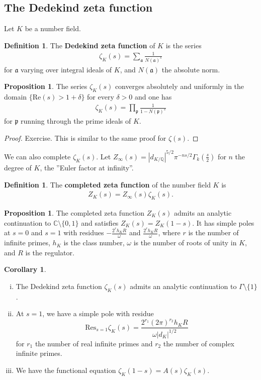 \documentclass{article}
\theoremstyle{definition}
\newtheorem{cor}[theorem]{Corollary}
\newtheorem{prop}[theorem]{Proposition}
\newtheorem{defn}[theorem]{Definition}
\begin{document}
\subsection{The Dedekind zeta function}


Let $K$ be a number field.
\begin{defn}\label{defn2.21}
    The \textbf{Dedekind zeta function} of $K$ is the series 
    \begin{align*}
        \zeta_K(s) = \sum_{\mathfrak{a}}^{} \frac{1}{N(\mathfrak{a})^s} 
    \end{align*}
    for $\mathfrak{a}$ varying over integral ideals of $K$, and $N(\mathfrak{a})$ the absolute norm.
\end{defn}
\begin{prop}\label{prop2.22}
    The series $\zeta_K(s)$ converges absolutely and uniformly in the domain $\{\text{Re}(s)>1+\delta\}$ for every $\delta>0$ and one has 
    \begin{align*}
        \zeta_K(s) = \prod_{\mathfrak{p}}^{} \frac{1}{1-N(\mathfrak{p})^s} 
    \end{align*}
    for $\mathfrak{p}$ running through the prime ideals of $K$.
\end{prop}
\begin{proof}
    Exercise. This is similar to the same proof for $\zeta(s)$.
\end{proof}
We can also complete $\zeta_K(s)$. Let $Z_{\infty}(s) = \left|d_{K/\mathbb{Q}}\right|^{5/2}\pi^{-ns/2}\Gamma_k \left(\frac{s}{2}\right)$ for $n$ the degree of $K$, the ''Euler factor at infinity''.
\begin{defn}\label{defn2.23}
    The \textbf{completed zeta function} of the number field $K$ is 
    \begin{align*}
        Z_{K}(s) = Z_{\infty}(s)\zeta_K(s).
    \end{align*}
\end{defn}
\begin{prop}\label{prop2.24}
    The completed zeta function $Z_K(s)$ admits an analytic continuation to $\mathbb{C}\setminus \{0,1\}$ and satisfies $Z_K(s) = Z_K(1-s)$. It has simple poles at $s =0$ and $s=1$ with residues $-\frac{2^r h_K R}{\omega}$ and $\frac{2^r h_K R}{\omega}$, where $r$ is the number of infinite primes, $h_K$ is the class number, $\omega$ is the number of roots of unity in $K$, and $R$ is the regulator.
\end{prop}
\begin{cor}\label{cor2.25}
    \begin{enumerate}[(i)]
        \item The Dedekind zeta function $\zeta_K(s)$ admits an analytic continuation to $\Gamma\setminus \{1\}$.
        \item At $s=1$, we have a simple pole with residue $$\text{Res}_{s=1}\zeta_K(s) = \frac{2^{r_1}(2\pi)^{r_2 }h_K R}{\omega \left|d_K\right|^{1/2}}$$
        for $r_1$ the number of real infinite primes and $r_2$ the number of complex infinite primes.
        \item We have the functional equation $\zeta_K(1-s) = A(s)\zeta_K(s)$.
    \end{enumerate}
\end{cor}
\end{document}
